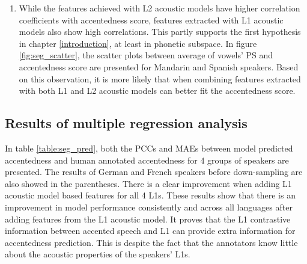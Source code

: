 \begin{enumerate}
 \item While the features achieved with L2 acoustic models have higher correlation coefficients with accentedness score, features extracted with L1 acoustic models also show high correlations. This partly supports the first hypothesis in chapter \ref{introduction}, at least in phonetic subspace. In figure \ref{fig:seg_scatter}, the scatter plots between average of vowels' PS and accentedness score are presented for Mandarin and Spanish speakers. Based on this observation, it is more likely that when combining features extracted with both L1 and L2 acoustic models can better fit the accentedness score.
\end{enumerate}

\subsection{Results of multiple regression analysis}

In table \ref{table:seg_pred}, both the PCCs and MAEs between model predicted accentedness and human annotated accentedness for 4 groups of speakers are presented. The results of German and French speakers before down-sampling are also showed in the parentheses. There is a clear improvement when adding L1 acoustic model based features for all 4 L1s. These results show that there is an improvement in model performance consistently and across all languages after adding features from the L1 acoustic model. It proves that the L1 contrastive information between accented speech and L1 can provide extra information for accentedness prediction. This is despite the fact that the annotators know little about the acoustic properties of the speakers' L1s.

